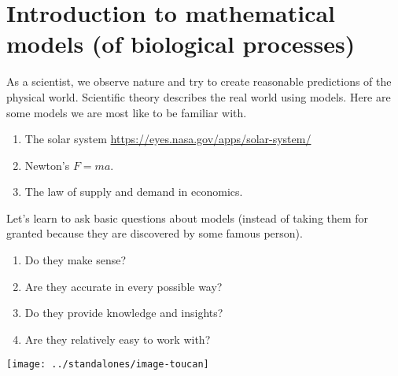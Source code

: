 \documentclass[../main.tex]{subfiles}
\begin{document}
 \section{Introduction to mathematical models (of biological processes)}

As a scientist, we observe nature and try to create reasonable predictions of the physical world. Scientific theory describes the real world using models. Here are some models we are most like to be familiar with.

\begin{enumerate}
  \item The solar system \url{https://eyes.nasa.gov/apps/solar-system/}
  \item Newton's \(F = ma\).
  \item The law of supply and demand in economics.
\end{enumerate}

Let's learn to ask basic questions about models (instead of taking them for granted because they are discovered by some famous person).
\begin{enumerate}[wide]
  \item Do they make sense? 


  \item Are they accurate in every possible way? 


  \item Do they provide knowledge and insights? 


  \item Are they relatively easy to work with? 

\end{enumerate}

\clearpage
\vspace{-1in}
\centerline{\texttt{[image: ../standalones/image-toucan]}}
\end{document}
